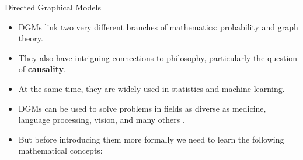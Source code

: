 \documentclass[handout]{beamer}
\begin{document}
\begin{frame}{Directed Graphical Models}
\scriptsize{
\begin{itemize}
\item DGMs link two very different branches of mathematics: probability and graph theory. 

\item They also have intriguing connections to philosophy, particularly the question of \textbf{causality}.

\item At the same time, they are widely used in statistics and machine learning.

\item DGMs can be used to solve problems in fields as diverse as medicine, language processing, vision, and many others \cite{ermon_kuleshov}. 

\item But before introducing them more formally we need to learn the following mathematical concepts:


 
\end{itemize}



} 

\end{frame}
\end{document}
